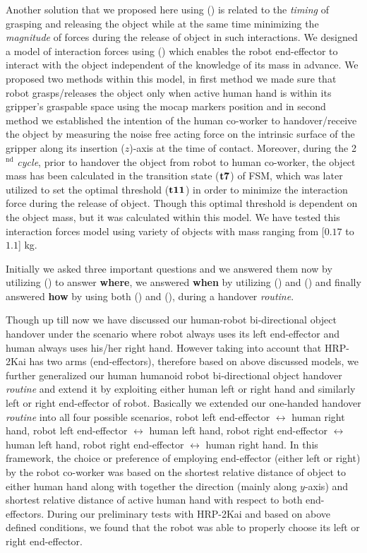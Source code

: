 Another solution that we proposed here using () is related to the \textit{timing} of grasping and releasing the object while at the same time minimizing the \textit{magnitude} of forces during the release of object in such interactions. We designed a model of interaction forces using () which enables the robot end-effector to interact with the object independent of the knowledge of its mass in advance. We proposed two methods within this model, in first method we made sure that robot grasps/releases the object only when active human hand is within its gripper's graspable space using the mocap markers position and in second method we established the intention of the human co-worker to handover/receive the object by measuring the noise free acting force on the intrinsic surface of the gripper along its insertion ($z$)-axis at the time of contact. Moreover, during the 2$ {}^\text{nd} $ \textit{cycle}, prior to handover the object from robot to human co-worker, the object mass has been calculated in the transition state ($ \bf{t7} $) of FSM, which was later utilized to set the optimal threshold ($ \bf{t11} $) in order to minimize the interaction force during the release of object. Though this optimal threshold is dependent on the object mass, but it was calculated within this model. We have tested this interaction forces model  using variety of objects with mass ranging from [$ 0.17 $ to $ 1.1 $] kg.


Initially we asked three important questions and we answered them now by utilizing () to answer \textbf{where}, we answered \textbf{when} by utilizing () and () and finally answered \textbf{how} by using both () and (), during a handover \textit{routine}.


Though up till now we have discussed our human-robot bi-directional object handover under the scenario where robot always uses its left end-effector and human always uses his/her right hand. However taking into account that HRP-2Kai has two arms (end-effectors), therefore based on above discussed models, we further generalized our human humanoid robot bi-directional object handover \textit{routine} and extend it by exploiting either human left or right hand and similarly left or right end-effector of robot. Basically we extended our one-handed handover \textit{routine} into all four possible scenarios, robot left end-effector $\longleftrightarrow$ human right hand, robot left end-effector $\longleftrightarrow$ human left hand, robot right end-effector $\longleftrightarrow$ human left hand, robot right end-effector  $\longleftrightarrow$ human right hand. In this framework, the choice or preference of employing end-effector (either left or right) by the robot co-worker was based on the shortest relative distance of object to either human hand along with together the direction (mainly along $y$-axis) and shortest relative distance of active human hand with respect to both end-effectors. During our preliminary tests with HRP-2Kai and based on above defined conditions, we found that the robot was able to properly choose its left or right end-effector.
 
